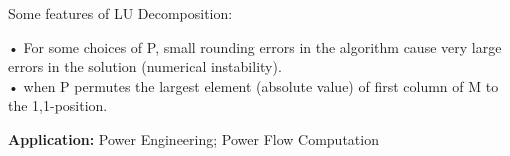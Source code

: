 \documentclass[]{finalproject}
\begin{document}
\begin{flushleft}
Some features of LU Decomposition:
\begin{flushleft}
• For some choices of P, small rounding errors in the algorithm cause very
large errors in the solution (numerical instability).\\
• when P permutes the largest element (absolute value) of first column of M to the 1,1-position.
\end{flushleft}


\textbf{Application:} Power Engineering; Power Flow Computation \cite{lu_application} \newline

\end{flushleft}
\end{document}
